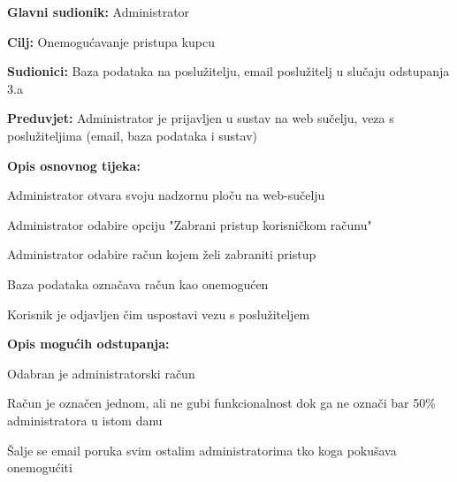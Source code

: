 				
				\noindent {}
				\begin{packed_item}
					\item \textbf{Glavni sudionik:} Administrator
					\item  \textbf{Cilj:} Onemogućavanje pristupa kupcu
					\item  \textbf{Sudionici:} Baza podataka na poslužitelju, email poslužitelj u slučaju odstupanja 3.a
					\item  \textbf{Preduvjet:} Administrator je prijavljen u sustav na web sučelju, veza s poslužiteljima (email, baza podataka i sustav)
					\item  \textbf{Opis osnovnog tijeka:}
					\item[] \begin{packed_enum}
						\item Administrator otvara svoju nadzornu ploču na web-sučelju
						\item Administrator odabire opciju "Zabrani pristup korisničkom računu"
						\item Administrator odabire račun kojem želi zabraniti pristup
						\item Baza podataka označava račun kao onemogućen
						\item Korisnik je odjavljen čim uspostavi vezu s poslužiteljem
					\end{packed_enum}
					\item  \textbf{Opis mogućih odstupanja:}
					\item[] \begin{packed_item}
						\item[3.a] Odabran je administratorski račun
						\item[] \begin{packed_enum}
							\item Račun je označen jednom, ali ne gubi funkcionalnost dok ga ne označi bar 50\% administratora u istom danu
							\item Šalje se email poruka svim ostalim administratorima tko koga pokušava onemogućiti 
						\end{packed_enum}
					\end{packed_item}
				\end{packed_item}
			
